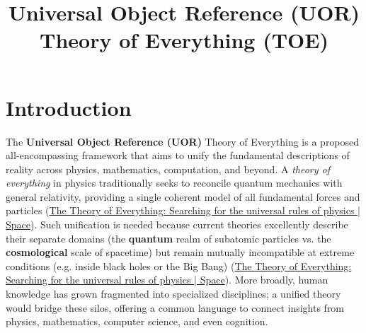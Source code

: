 \documentclass[12pt]{article}
\title{Universal Object Reference (UOR) Theory of Everything (TOE)}
\author{}
\date{}
\begin{document}
\maketitle

\section{Introduction}

The \textbf{Universal Object Reference (UOR)} Theory of Everything is a proposed all-encompassing framework that aims to unify the fundamental descriptions of reality across physics, mathematics, computation, and beyond. A \emph{theory of everything} in physics traditionally seeks to reconcile quantum mechanics with general relativity, providing a single coherent model of all fundamental forces and particles (\href{https://www.space.com/theory-of-everything-definition.html#:~:text=The%20Theory%20of%20Everything%3A%20Searching%20for%20the%20universal%20rules%20of%20physics}{The Theory of Everything: Searching for the universal rules of physics | Space}). Such unification is needed because current theories excellently describe their separate domains (the \textbf{quantum} realm of subatomic particles vs. the \textbf{cosmological} scale of spacetime) but remain mutually incompatible at extreme conditions (e.g. inside black holes or the Big Bang) (\href{https://www.space.com/theory-of-everything-definition.html#:~:text=Figuring%20out%20such%20an%20all,before%20his%20death%20in%202018}{The Theory of Everything: Searching for the universal rules of physics | Space}). More broadly, human knowledge has grown fragmented into specialized disciplines; a unified theory would bridge these silos, offering a common language to connect insights from physics, mathematics, computer science, and even cognition.

\bigskip
\end{document}
